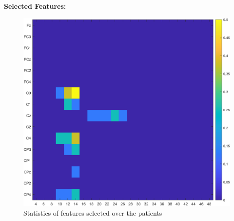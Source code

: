 \label{sec:results}
{\Large \textbf{Selected Features:}}

\begin{figure}[h!]
	\begin{center}
		 \includegraphics[width=0.5\linewidth]{img/avg_selected_feature_n4features_autofilter.png}
	\end{center}

	 \caption{Statistics of features selected over the patients}
	 \label{fig:/avg_selected_feature_n4features_autofilter}
\end{figure}